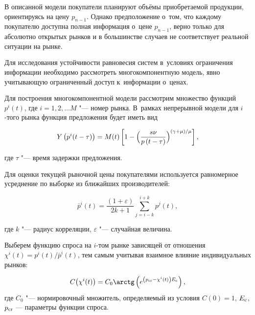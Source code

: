 В описанной модели покупатели планируют объёмы приобретаемой продукции, ориентируясь на цену $p_{n-1} $. Однако предположение о~том, что каждому покупателю доступна полная информация о~цене $p_{n-1} $, верно только для абсолютно открытых рынков и в большинстве случаев не соответствует реальной ситуации на рынке. 

Для исследования устойчивости равновесия систем в~условиях ограничения информации необходимо рассмотреть многокомпонентную модель, явно учитывающую ограниченный доступ к~информации о~ценах.



\smallskip






Для построения многокомпонентной модели рассмотрим множество функций $p^{i} (t)$, где $i=1, 2, \dots M$ "--- номер рынка.  В~рамках непрерывной модели для $i$-того рынка функция предложения будет иметь вид

\begin{equation}

Y\left(p^{i} (t-\tau )\right)=M(t)\left[1-\Bigl(\frac{s\nu }{p\left(t-\tau \right)} \Bigr)^{(\gamma +\mu )/\mu } \right], 

\label{pivovarova-eq:7} 

\end{equation} 

где $\tau $ "--- время задержки предложения.



Для оценки текущей рыночной цены покупателями используется равномерное усреднение по выборке из ближайших производителей:

$$\bar{p}^{i}(t) =\frac{(1+\varepsilon)}{2k+1}{\sum _{j=i-k}^{i+k}p^{j}(t)  } , $$ 

где $k$ "--- радиус корреляции, $\varepsilon $ "--- случайная величина.



Выберем функцию спроса на $i$-том рынке  зависящей от отношения  $\chi^i(t)=p^{i} (t)/ \bar{p}^{i} (t)$, тем самым учитывая взаимное влияние индивидуальных рынков:

\begin{equation}  

C\bigl(\chi^{i} (t) \bigr)=C_{0} \arctg\left(e^{\left(p_{\rm cr} -\chi^{i} (t)  \right)E_{\rm c} }\right),

\label{pivovarova-eq:8}

\end{equation}  где $C_{0} $ "--- нормировочный множитель, определяемый из условия $C(0)=1$, $E_{\rm c} $, $p_{\rm cr} $ --- параметры функции спроса.



